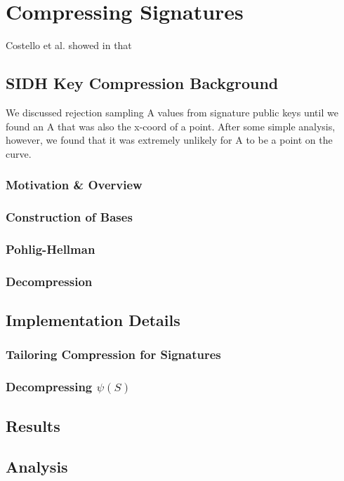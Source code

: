 \chapter{Compressing Signatures}

Costello et al. showed in \cite{pkcomp} that  

\section{SIDH Key Compression Background}

We discussed rejection sampling A values from signature public keys until we found an A that was also the x-coord of a point. After some simple analysis, however, we found that it was extremely unlikely for A to be a point on the curve.\\

\subsection{Motivation \& Overview}


\subsection{Construction of Bases}

\subsection{Pohlig-Hellman}

\subsection{Decompression}

\section{Implementation Details}

\subsection{Tailoring Compression for Signatures}

\subsection{Decompressing $\psi(S)$}

\section{Results}

\section{Analysis}


